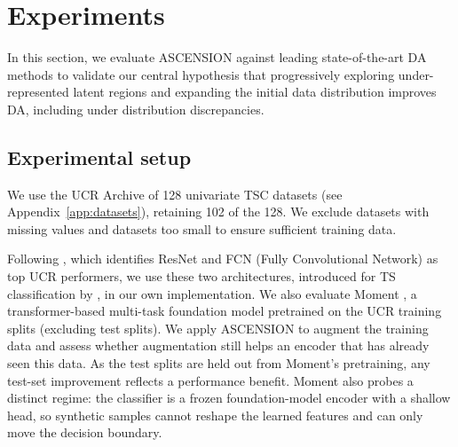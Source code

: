 \newcommand{\daLegMark}[2][0.9pt]{\textcolor{#2}{\rule[1.6pt]{1.2em}{#1}}}
\newcommand{\daLegItem}[2]{\daLegMark{#1}\,#2}
\newcommand{\daLegItemBold}[2]{\daLegMark[1.7pt]{#1}\,\textbf{#2}}
\newcommand{\daLegendBlock}{%
  {\small\centering
   \daLegItemBold{daASC}{ASCENSION}\hspace{1.0em}%
   \daLegItem{daDif}{Diffusion-TS}\hspace{1.0em}%
   \daLegItem{daFAA}{FAA}\hspace{1.0em}%
   \daLegItem{daIma}{ImagenTime}\hspace{1.0em}%
   \daLegItem{daKoV}{KoVAE}\par
   \daLegItem{daLA}{LA}\hspace{1.0em}%
   \daLegItem{daTTS}{TTS-GAN}\hspace{1.0em}%
   \daLegItem{daTDD}{Time-DDPM}\hspace{1.0em}%
   \daLegItem{daVaD}{VaDE}\par}%
}

\section{Experiments}
\label{sec:experiments}

In this section, we evaluate ASCENSION against leading state-of-the-art DA methods to validate our central hypothesis
that progressively exploring under-represented latent regions and
expanding the initial data distribution improves DA, including
under distribution discrepancies.

\subsection{Experimental setup}
\label{sec:setup:experimental}

We use the UCR Archive of 128 univariate TSC datasets (see
Appendix~\ref{app:datasets}), retaining 102 of the 128. We exclude
datasets with missing values and datasets too small to ensure
sufficient training data.


Following \citep{fawaz2019deep}, which identifies ResNet and
FCN (Fully Convolutional Network) as top UCR performers, we use these two
architectures, introduced for TS classification by \citep{wang2017time},
in our own implementation. We also evaluate
Moment \citep{goswami2024moment}, a transformer-based multi-task
foundation model pretrained on the UCR training splits (excluding
test splits). We apply ASCENSION to augment the training data and
assess whether augmentation still helps an encoder that has
already seen this data. As the test splits are held out from
Moment's pretraining, any test-set improvement reflects a performance benefit.
Moment also probes a distinct regime: the classifier is a frozen
foundation-model encoder with a shallow head, so synthetic samples
cannot reshape the learned features and can only move the decision
boundary.

